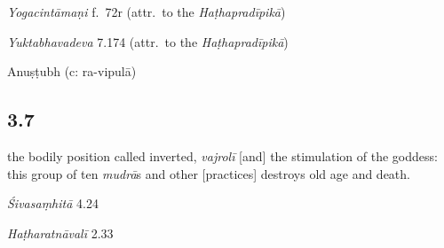 \begin{ekdosis}
\begin{testimonia}[hp03_006]
\emph{Yogacintāmaṇi} f.~72r (attr.~to the \emph{Haṭhapradīpikā})
\begin{versinnote}
\end{versinnote}

\emph{Yuktabhavadeva} 7.174 (attr.~to the \emph{Haṭhapradīpikā})
\begin{versinnote}
\end{versinnote}
\end{testimonia}



\begin{metre}[hp03_006]
Anuṣṭubh (c: ra-vipulā)
\end{metre}

\subsection*{3.7}
\begin{translation}[hp03_007]
[\ldots] the bodily position called inverted, \emph{vajrolī} [and] the stimulation of the goddess: this group of ten \emph{mudrā}s and other [practices] destroys old age and death. 
\end{translation}

\begin{sources}[hp03_007]
\emph{Śivasaṃhitā} 4.24
\begin{versinnote}
\end{versinnote}
\end{sources}

\begin{testimonia}[hp03_007]
\emph{Haṭharatnāvalī} 2.33
\begin{versinnote}
\end{versinnote}


\end{testimonia}
\end{ekdosis}
